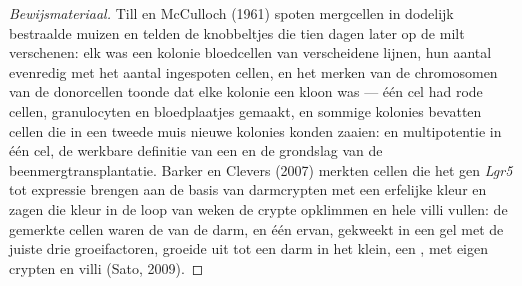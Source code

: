 \begin{proof}[Bewijsmateriaal]
Till en McCulloch (1961) spoten mergcellen in dodelijk bestraalde
muizen en telden de knobbeltjes die tien dagen later op de milt
verschenen: elk was een kolonie bloedcellen van verscheidene lijnen,
hun aantal evenredig met het aantal ingespoten cellen, en het merken
van de chromosomen van de donorcellen toonde dat elke kolonie een kloon
was --- één cel had rode cellen, granulocyten en bloedplaatjes gemaakt,
en sommige kolonies bevatten cellen die in een tweede muis nieuwe
kolonies konden zaaien:  en multipotentie in één cel, de
werkbare definitie van een  en de grondslag van de
beenmergtransplantatie. Barker en Clevers (2007) merkten cellen die het
gen \emph{Lgr5} tot expressie brengen aan de basis van darmcrypten met
een erfelijke kleur en zagen die kleur in de loop van weken de crypte
opklimmen en hele villi vullen: de gemerkte cellen waren de 
van de darm, en één ervan, gekweekt in een gel met de juiste drie
groeifactoren, groeide uit tot een darm in het klein, een
\emph{}, met eigen crypten en villi (Sato, 2009).
\end{proof}

